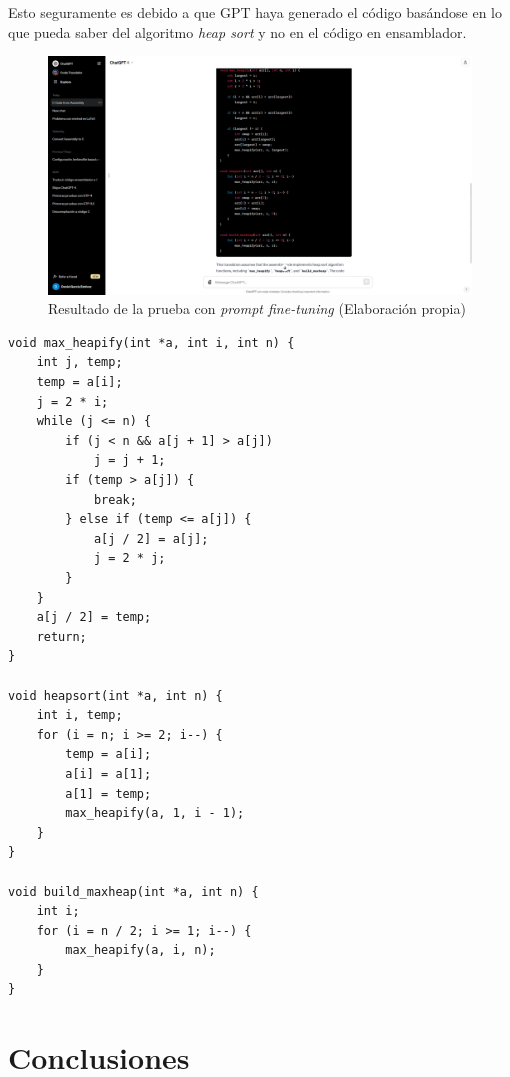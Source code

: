 Esto seguramente es debido a que GPT haya generado el código basándose en lo que pueda saber del algoritmo
\textit{heap sort} y no en el código en ensamblador.

\begin{figure}[H]
    \begin{center}
      \includegraphics[scale=0.3]{figuras/Capitulo_05/ResultadoPromptGPT4.png}
    \end{center}
    \caption[Resultado de la prueba con \textit{prompt fine-tuning}]{Resultado de la prueba con \textit{prompt fine-tuning} (Elaboración propia)}
    \label{fig:resultado_gpt4_prompt}
\end{figure}

\begin{mycode}
    \begin{verbatim}
void max_heapify(int *a, int i, int n) {
    int j, temp;
    temp = a[i];
    j = 2 * i;
    while (j <= n) {
        if (j < n && a[j + 1] > a[j])
            j = j + 1;
        if (temp > a[j]) {
            break;
        } else if (temp <= a[j]) {
            a[j / 2] = a[j];
            j = 2 * j;
        }
    }
    a[j / 2] = temp;
    return;
}

void heapsort(int *a, int n) {
    int i, temp;
    for (i = n; i >= 2; i--) {
        temp = a[i];
        a[i] = a[1];
        a[1] = temp;
        max_heapify(a, 1, i - 1);
    }
}

void build_maxheap(int *a, int n) {
    int i;
    for (i = n / 2; i >= 1; i--) {
        max_heapify(a, i, n);
    }
}
    \end{verbatim}
    \caption[Código original en C del algoritmo \textit{heap sort}]{Código original en C del algoritmo \textit{heap sort} (Elaboración propia)}
    \label{cod:heapSortC}
\end{mycode}

\section{Conclusiones}
\label{sec:conclusiones}

